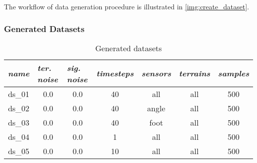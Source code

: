 The workflow of data generation procedure is illustrated in \cref{img:create_dataset}. 

\subsubsection*{Generated Datasets} \label{sssec:generated_datasets}

\begin{table}[H]
\centering
\caption{Generated datasets}
\label{tab:generated_datasets}
\begin{tabular}{|c|c|c|c|c|c|c|}
\hline
\multicolumn{1}{|l|}{\textit{name}} & \multicolumn{1}{l|}{\textit{ter. noise}} & \multicolumn{1}{l|}{\textit{sig. noise}} & \multicolumn{1}{l|}{\textit{timesteps}} & \multicolumn{1}{l|}{\textit{sensors}} & \multicolumn{1}{l|}{\textit{terrains}} & \multicolumn{1}{l|}{\textit{samples}} \\ \hline
ds\_01                              & 0.0                                             & 0.0                                            & 40                                      & all                                   & all                                    & 500                                     \\ \hline
ds\_02                              & 0.0                                             & 0.0                                            & 40                                      & angle                                 & all                                    & 500                                     \\ \hline
ds\_03                              & 0.0                                             & 0.0                                            & 40                                      & foot                                  & all                                    & 500                                     \\ \hline
ds\_04                              & 0.0                                             & 0.0                                            & 1                                       & all                                   & all                                    & 500                                     \\ \hline
ds\_05                              & 0.0                                             & 0.0                                            & 10                                      & all                                   & all                                    & 500                                     \\ \hline

\end{tabular}
\end{table}
